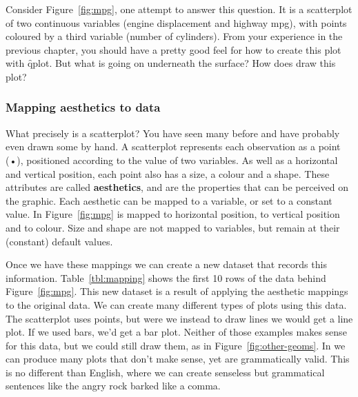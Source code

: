 Consider Figure~\ref{fig:mpg}, one attempt to answer this question.  It is a scatterplot of two continuous variables (engine displacement and highway mpg), with points coloured by a third variable (number of cylinders).  From your experience in the previous chapter, you should have a pretty good feel for how to create this plot with \f{qplot}.  But what is going on underneath the surface?  How does \ggplot draw this plot?

% 
% 


\subsubsection{Mapping aesthetics to data}

What precisely is a scatterplot? You have seen many before and have probably even drawn some by hand. A scatterplot represents each observation as a point (•), positioned according to the value of two variables. As well as a horizontal and vertical position, each point also has a size, a colour and a shape. These attributes are called {\bf aesthetics}, and are the properties that can be perceived on the graphic. Each aesthetic can be mapped to a variable, or set to a constant value. In Figure~\ref{fig:mpg}  is mapped to horizontal position,  to vertical position and  to colour. Size and shape are not mapped to variables, but remain at their (constant) default values.

Once we have these mappings we can create a new dataset that records this information. Table~\ref{tbl:mapping} shows the first 10 rows of the data behind Figure~\ref{fig:mpg}. This new dataset is a result of applying the aesthetic mappings to the original data. We can create many different types of plots using this data. The scatterplot uses points, but were we instead to draw lines we would get a line plot. If we used bars, we'd get a bar plot. Neither of those examples makes sense for this data, but we could still draw them, as in Figure~\ref{fig:other-geoms}. In \ggplot we can produce many  plots that don't make sense, yet are grammatically valid.  This is no different than English, where we can create senseless but grammatical sentences like the angry rock barked like a comma.

